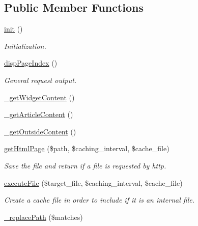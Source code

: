 \subsection*{Public Member Functions}
\begin{DoxyCompactItemize}
\item 
\hyperlink{classpageView_a203a3f77c9ece543e00517e647f1e07b}{init} ()
\begin{DoxyCompactList}\small\item\em Initialization. \end{DoxyCompactList}\item 
\hyperlink{classpageView_a9e3cf0b29ff11a4bbb1ec1ccfacd4236}{disp\-Page\-Index} ()
\begin{DoxyCompactList}\small\item\em General request output. \end{DoxyCompactList}\item 
\hyperlink{classpageView_a5f10c6cf83c7e65e3359423211ead3d8}{\-\_\-get\-Widget\-Content} ()
\item 
\hyperlink{classpageView_a8f6d1347a1991eec2ae2b964f5fec274}{\-\_\-get\-Article\-Content} ()
\item 
\hyperlink{classpageView_aa8045c86496ebdaa32c18e648be079f3}{\-\_\-get\-Outside\-Content} ()
\item 
\hyperlink{classpageView_af3d32b790b5703c5eb384060b24d619e}{get\-Html\-Page} (\$path, \$caching\-\_\-interval, \$cache\-\_\-file)
\begin{DoxyCompactList}\small\item\em Save the file and return if a file is requested by http. \end{DoxyCompactList}\item 
\hyperlink{classpageView_a198777f4c0155f8ad2a0c2826221395e}{execute\-File} (\$target\-\_\-file, \$caching\-\_\-interval, \$cache\-\_\-file)
\begin{DoxyCompactList}\small\item\em Create a cache file in order to include if it is an internal file. \end{DoxyCompactList}\item 
\hyperlink{classpageView_a271e9a47148d838689894366475cefd2}{\-\_\-replace\-Path} (\$matches)
\end{DoxyCompactItemize}
